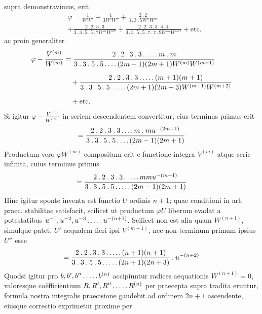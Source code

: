 supra demonstravimus, erit
\[
\begin{aligned}&\varphi=\frac1{WW'}+\frac1{3W'W''}+\frac{2\mathbin{.}2}{3\mathbin{.}3\mathbin{.}5W''W'''}\\[5pt]&+\frac{2\mathbin{.}2\mathbin{.}3\mathbin{.}3}{3\mathbin{.}3\mathbin{.}5\mathbin{.}5\mathbin{.}7W'''W''''}+\frac{2\mathbin{.}2\mathbin{.}3\mathbin{.}3\mathbin{.}4\mathbin{.}4}{3\mathbin{.}3\mathbin{.}5\mathbin{.}5\mathbin{.}7\mathbin{.}7\mathbin{.}9W''''W'''''}+\text{etc.}\end{aligned}
\]
ac proin generaliter
\[
\begin{aligned}
\varphi-\frac{V^{(m)}}{W^{(m)}}&=\frac{2\mathbin{.}2\mathbin{.}3\mathbin{.}3\mathinner{.\,.\,.\,.\,.} m\mathbin{.}m}{3\mathbin{.}3\mathbin{.}5\mathbin{.}5\mathinner{.\,.\,.\,.}(2m-1)(2m+1)W^{(m)}W^{(m+1)}}\\[5pt]
&\quad+\frac{2\mathbin{.}2\mathbin{.}3\mathbin{.}3\mathinner{.\,.\,.\,.\,.}(m+1)(m+1)}{3\mathbin{.}3\mathbin{.}5\mathbin{.}5\mathinner{.\,.\,.\,.\,.}(2m+1)(2m+3)W^{(m+1)}W^{(m+2)}}\\[5pt]
&\quad+\text{etc.}
\end{aligned}
\]
Si igitur $\varphi-\frac{V^{(m)}}{W^{(m)}}$ in seriem descendentem convertitur, eius terminus primus erit
\[
=\frac{2\mathbin{.}2\mathbin{.}3\mathbin{.}3\mathinner{.\,.\,.\,.} m\mathbin{.}m u^{-(2m+1)}}{3\mathbin{.}3\mathbin{.}5\mathbin{.}5\mathinner{.\,.\,.\,.}(2m-1)(2m+1)}
\]
Productum vero $\varphi W^{(m)}$ compositum erit e functione integra $V^{(m)}$ atque serie
infinita, cuius terminus primus
\[
=\frac{2\mathbin{.}2\mathbin{.}3\mathbin{.}3\mathinner{.\,.\,.\,.\,.} mmu^{-(m+1)}}{3\mathbin{.}3\mathbin{.}5\mathbin{.}5\mathinner{.\,.\,.\,.\,.}(2m-1)(2m+1)}
\]
Hinc igitur sponte inventa est functio $U$ ordinis $n+1$; quae conditioni in
art. praec. stabilitae satisfacit, scilicet ut productum $\varphi U$ liberum evadat a potestatibus $u^{-1},u^{-2},u^{-3}\mathinner{.\,.\,.\,.\,.} u^{-(n+1)}$. Scilicet non est alia quam $W^{(n+1)}$, simulque patet, $U'$ aequalem fieri ipsi $V^{(m+1)}$, nec non terminum primum ipsius
$U''$ esse
\[
=\frac{2\mathbin{.}2\mathbin{.}3\mathbin{.}3\mathinner{.\,.\,.\,.\,.}(n+1)(n+1)}{3\mathbin{.}3\mathbin{.}5\mathbin{.}5\mathinner{.\,.\,.\,.\,.}(2n+1)(2n+3)}\mathbin{.}u^{-(n+2)}
\]
Quodsi igitur pro $b,b',b''\mathinner{.\,.\,.\,.\,.} b^{(n)}$ accipiuntur radices aequationis $W^{(n+1)}=0$,
valoresque coëfficientium $R,R',R''\mathinner{.\,.\,.\,.\,.} R^{(n)}$ per praecepta supra tradita eruntur, formula nostra integralis praecisione gaudebit ad ordinem $2n+1$ ascendente, eiusque correctio exprimetur proxime per
